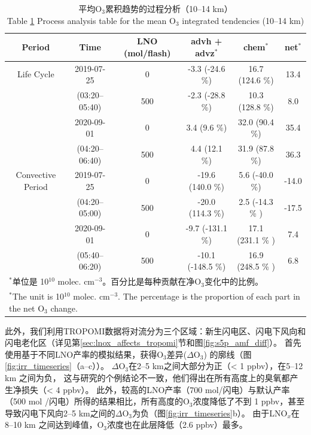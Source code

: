 \begin{table}[h]
\centering
\caption{平均O$_3$累积趋势的过程分析（10--14 km）\\ Table \ref{table:ipr} Process analysis table for the mean O$_3$ integrated tendencies (10--14 km)}
\begin{tabular}{@{\extracolsep{\fill}} cccccc}
\hline
  Period           & Time             & LNO (mol/flash) & advh + advz$^*$       & chem$^*$              & net$^*$    \\
\hline
Life Cycle         & 2019-07-25       & 0               & -3.3 (-24.6 \%)        & 16.7 (124.6 \%)        & 13.4       \\
                   & (03:20--05:40)   & 500             & -2.3 (-28.8 \%)        & 10.3 (128.8 \%)        & 8.0        \\
\cline{2-6}
                   & 2020-09-01       & 0               & 3.4  (9.6 \%)          & 32.0 (90.4 \%)         & 35.4       \\
                   & (04:20--06:40)   & 500             & 4.4  (12.1 \%)         & 31.9 (87.8 \%)         & 36.3       \\
\hline
Convective Period   & 2019-07-25      & 0              & -19.6 (140.0 \%)       & 5.6 (-40.0 \%)         & -14.0      \\
                    & (04:20--05:00)  & 500            & -20.0 (114.3 \%)       & 2.5 (-14.3 \% )        & -17.5      \\
\cline{2-6}
                    & 2020-09-01      & 0              & -9.7  (-131.1 \%)      & 17.1 (231.1 \% )       & 7.4        \\
                    & (05:40--06:20)  & 500            & -10.1 (-148.5 \%)      & 16.9 (248.5 \% )       & 6.8        \\
\hline
\multicolumn{6}{l}{$^{*}$单位是 10$^{10}$ molec. cm$^{-3}$。百分比是每种贡献在净O$_3$变化中的比例。} \\
\multicolumn{6}{l}{$^{*}$The unit is 10$^{10}$ molec. cm$^{-3}$. The percentage is the proportion of each part in the net O$_3$ change.}
\end{tabular}
\label{table:ipr}
\end{table}


此外，我们利用TROPOMI数据将对流分为三个区域：新生闪电区、闪电下风向和闪电老化区（详见第\ref{sec:lnox_affects_tropomi}节和图\ref{fig:s5p_amf_diff}）。
首先使用基于不同LNO产率的模拟结果，获得O$_3$差异($\Delta$O$_3$) 的廓线（图\ref{fig:irr_timeseries}（a--c））。
$\Delta$O$_3$在2--5 km之间大部分为正（< 1 ppbv），在5--12 km 之间为负，
这与\citet{Ott.2007}研究的个例结论不一致，他们得出在所有高度上的臭氧都产生净损失（< 4 ppbv）。
此外，较高的LNO产率（700 mol/闪电）与默认产率（500 mol /闪电）所得的结果相比，所有高度的O$_3$浓度降低了不到 1 ppbv，甚至导致闪电下风向2--5 km之间的$\Delta$O$_3$为负（图\ref{fig:irr_timeseries}b）。
由于LNO$_x$在8--10 km 之间达到峰值，O$_3$浓度也在此层降低（2.6 ppbv）最多。

